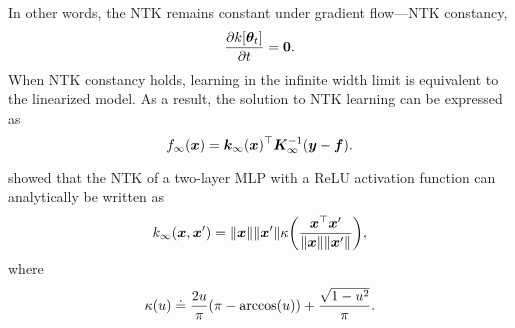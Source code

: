 In other words, the NTK remains constant under gradient flow---NTK constancy, \[
    \pdv{k[\bm{\theta}_t]}{t} = \bm{0}.
\]
When NTK constancy holds, learning in the infinite width limit is equivalent to the linearized
model. As a result, the solution to NTK learning can be expressed as \[
    f_\infty(\bm{x}) = \bm{k}_\infty(\bm{x})^\top \bm{K}_\infty^{-1} (\bm{y} - \bm{f}).
\]

\citet{bietti2019inductive} showed that the NTK of a two-layer MLP with a ReLU activation function
can analytically be written as \[
    k_\infty(\vec{x}, \vec{x}') = \| \vec{x} \| \| \vec{x}' \| \kappa \lft( \frac{\transpose{\vec{x}}\vec{x}'}{\| \vec{x} \| \| \vec{x}' \|} \rgt),
\]
where \[
    \kappa(u) \doteq \frac{2u}{\pi} \lft( \pi - \arccos(u) \rgt) + \frac{\sqrt{1-u^2}}{\pi}.
\]
